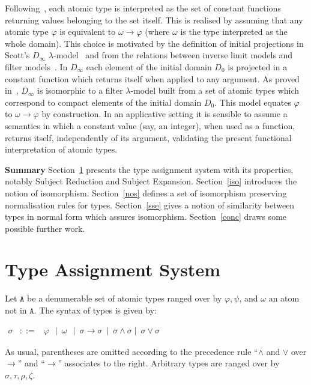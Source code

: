 \documentclass[UKenglish]{eptcs}
\newcommand{\tA}{\sigma}       \newcommand{\tB}{\tau}
\newcommand{\tC}{\rho}
\newcommand{\tD}{\zeta}
\newcommand{\tu}{\omega}
\newcommand{\labelx}[1]{\label{#1}}
\newcommand{\Co}{\texttt{A}}
\begin{document}
Following~\cite{CDMZ14}, each atomic type is interpreted as the set of constant functions returning values belonging to the set itself. This is realised
by assuming that any atomic type $\varphi$ is equivalent to $\omega \to \varphi$ (where $\omega$ is the type interpreted as the whole domain).
This choice is motivated by the definition of initial projections in Scott's $D_\infty$ $\lambda$-model~\cite{S72} and from the relations between inverse limit models and filter models~\cite{CDHL84}. In $D_\infty$  each element of the initial domain $D_0$ is projected in a constant function which returns itself when applied to any argument.
As proved in~\cite{CDHL84},  $D_\infty$ is isomorphic to a filter $\lambda$-model built from a set of atomic types which correspond to compact elements of the initial domain $D_0$. This model equates $\varphi$ to $\omega \to \varphi$ by construction.
In an applicative setting  it is sensible to assume a semantics in which a constant value (say, an integer), when used as a function, returns itself, independently of its argument, validating the present functional interpretation of atomic types.

{\bf Summary} Section~\ref{tas} presents the type assignment system with its properties, notably Subject Reduction and Subject Expansion. Section~\ref{iso} introduces the notion of
isomorphism.
Section~\ref{nos} defines a set of isomorphism preserving normalisation rules for types.
Section~\ref{sse} gives a notion of similarity between types in normal form which assures isomorphism. Section~\ref{conc} draws some possible further work.





\section{Type Assignment System}\labelx{tas}
Let $\Co$ be a denumerable set of atomic types ranged over by $\varphi,\psi$,  and $\tu$ an atom not in $\Co$. The  syntax of  types is given by:
\begin{center}
$\begin{array}{lll}
\tA&::=&\varphi~~\mid~\tu~~\mid~\sigma\to\sigma~\mid~\sigma\wedge\sigma\mid~\sigma\vee\sigma
\end{array}$
\end{center}
As usual, parentheses are omitted according to the precedence rule ``$\wedge$ and $\vee$ over $\rightarrow$'' and ``$\to$'' associates to the right.  Arbitrary types are ranged over by $\tA , \tB  , \tC, \tD$.
\end{document}

